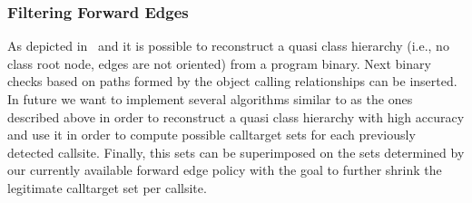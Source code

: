 \subsubsection{Filtering Forward Edges}
As depicted in~\cite{vci:asiaccs} and \cite{marx} it is possible to reconstruct
a quasi class hierarchy (i.e., no class root node, edges are not oriented) from 
a program binary. Next binary checks based on paths formed by the object calling 
relationships can be inserted. 
In future we want to implement several algorithms similar to as the ones described above
in order to reconstruct a quasi class hierarchy with high accuracy and use it in order to compute 
possible calltarget sets for each previously detected callsite. Finally, this sets
can be superimposed on the sets determined by our currently available forward edge policy with the goal
to further shrink the legitimate calltarget set per callsite.
